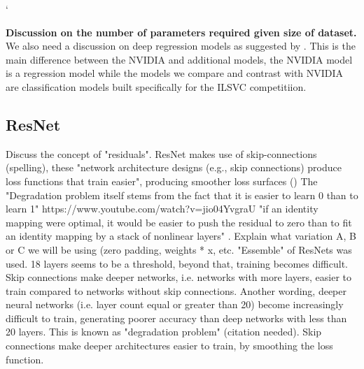 

`  

\textbf{Discussion on the number of parameters required given size of dataset.}  
We also need a discussion on deep regression models as suggested by \cite{lathuilire2018comprehensive}. This is the main difference between the NVIDIA and additional models, the NVIDIA model is a regression model while the models we compare and contrast with NVIDIA are classification models built specifically for the ILSVC  competitiion.

\subsection{ResNet}

Discuss the concept of "residuals". ResNet makes use of skip-connections (spelling), these "network architecture
designs (e.g., skip connections) produce loss functions that train easier", producing smoother loss surfaces (\cite{li2017visualizing})  
The "Degradation problem itself stems from the fact that it is easier to learn 0 than to learn 1"   https://www.youtube.com/watch?v=jio04YvgraU
"if an identity mapping were optimal, it would be easier to push the residual to zero than to fit an identity mapping by a stack of nonlinear layers" \cite{he2015deep}.  
Explain what variation A, B or C we will be using (zero padding, weights * x, etc.  
"Essemble" of ResNets was used.  
18 layers seems to be a threshold, beyond that, training becomes difficult. Skip connections make deeper networks, i.e. networks with more layers, easier to train compared to networks without skip connections.  
Another wording, deeper neural networks (i.e. layer count equal or greater than 20) become increasingly difficult to train, generating poorer accuracy than deep networks with less than 20 layers. This is known as "degradation problem" (citation needed). Skip connections make deeper architectures easier to train, by smoothing the loss function.

